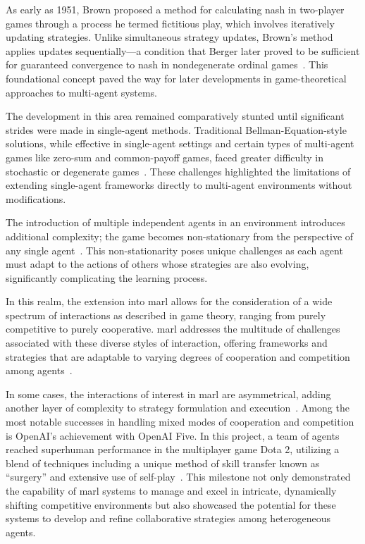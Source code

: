 As early as 1951, Brown proposed a method for calculating \gls{nash} in two-player games 
through a process he termed fictitious play, which involves iteratively updating strategies. 
Unlike simultaneous strategy updates, Brown's method applies updates sequentially—a condition 
that Berger later proved to be sufficient for guaranteed convergence to \gls{nash} in 
nondegenerate ordinal games~\cite{brown1951iterative, berger2005, berger2007}. 
This foundational concept paved the way for later developments in game-theoretical 
approaches to multi-agent systems.

The development in this area remained comparatively stunted until significant 
strides were made in single-agent methods. Traditional Bellman-Equation-style solutions, 
while effective in single-agent settings and certain types of multi-agent games like zero-sum and 
common-payoff games, faced greater difficulty in stochastic or degenerate games~\cite{shoham2007a}.
These challenges highlighted the limitations of extending single-agent frameworks directly to 
multi-agent environments without modifications.

The introduction of multiple independent agents in an environment introduces additional complexity;
the game becomes non-stationary from the perspective of any single agent~\cite{busoniu2008}. 
This non-stationarity poses unique challenges as each agent must adapt to the actions of others 
whose strategies are also evolving, significantly complicating the learning process.

In this realm, the extension into \gls{marl} allows for the consideration of a wide spectrum of 
interactions as described in game theory, ranging from purely competitive to purely cooperative. 
\gls{marl} addresses the multitude of challenges associated with these diverse styles of 
interaction, offering frameworks and strategies that are adaptable to varying degrees of 
cooperation and competition among agents~\cite{lowe2020}.

In some cases, the interactions of interest in \gls{marl} are asymmetrical, 
adding another layer of complexity to strategy formulation and execution~\cite*{sun2023}.
Among the most notable successes in handling mixed modes of cooperation and competition is 
OpenAI's achievement with OpenAI Five. In this project, a team of agents reached superhuman 
performance in the multiplayer game Dota 2, utilizing a blend of techniques including a unique 
method of skill transfer known as ``surgery'' and extensive use of self-play~\cite{berner2019}.
This milestone not only demonstrated the capability of \gls{marl} systems to manage and excel in 
intricate, dynamically shifting competitive environments but also showcased the potential for 
these systems to develop and refine collaborative strategies among heterogeneous agents.



